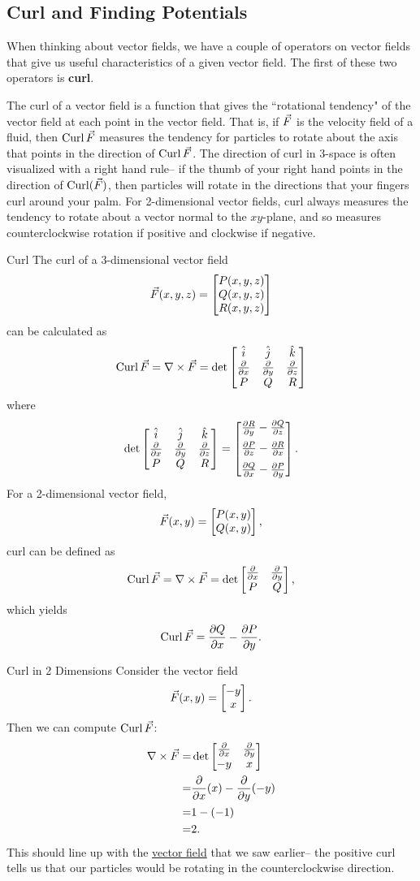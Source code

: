 \subsection{Curl and Finding Potentials}
When thinking about vector fields, we have a couple of operators on vector fields that give us useful characteristics of a given vector field. The first of these two operators is \textbf{curl}.

The curl of a vector field is a function that gives the ``rotational tendency" of the vector field at each point in the vector field. That is, if $\vec{F}$ is the velocity field of a fluid, then $\operatorname{Curl}\vec{F}$ measures the tendency for particles to rotate about the axis that points in the direction of $\operatorname{Curl}\vec{F}$. The direction of curl in 3-space is often visualized with a right hand rule-- if the thumb of your right hand points in the direction of $\operatorname{Curl}(\vec{F})$, then particles will rotate in the directions that your fingers curl around your palm. For 2-dimensional vector fields, curl always measures the tendency to rotate about a vector normal to the $xy$-plane, and so measures counterclockwise rotation if positive and clockwise if negative.

\begin{definition}{Curl}
The curl of a $3$-dimensional vector field $$\vec{F}(x,y,z)=\begin{bmatrix}P(x,y,z)\\Q(x,y,z)\\R(x,y,z)\end{bmatrix}$$ can be calculated as $$\operatorname{Curl} \vec{F}=\nabla\times\vec{F} =\det\begin{bmatrix}\hat{i} & \hat{j} & \hat{k} \\ \frac{\partial }{\partial x} & \frac{\partial }{\partial y} & \frac{\partial}{\partial z}\\ P&Q&R\end{bmatrix}$$ where $$\det\begin{bmatrix}\hat{i} & \hat{j} & \hat{k} \\ \frac{\partial }{\partial x} & \frac{\partial }{\partial y} & \frac{\partial}{\partial z}\\ P&Q&R\end{bmatrix}=\begin{bmatrix}\frac{\partial R}{\partial y} - \frac{\partial Q}{\partial z}\\[6pt] \frac{\partial P}{\partial z}-\frac{\partial R}{\partial x}\\[6pt] \frac{\partial Q}{\partial x}-\frac{\partial P}{\partial y}\end{bmatrix}. $$
For a 2-dimensional vector field, $$\vec{F}(x,y)=\begin{bmatrix}P(x,y)\\Q(x,y)\end{bmatrix}, $$ curl can be defined as $$\operatorname{Curl} \vec{F}=\nabla\times\vec{F}=\det\begin{bmatrix}\frac{\partial }{\partial x} & \frac{\partial }{\partial y}\\ P& Q\end{bmatrix}, $$ which yields $$\operatorname{Curl} \vec{F}=\frac{\partial Q}{\partial x}-\frac{\partial P}{\partial y}.$$
\end{definition}

\begin{example}{Curl in 2 Dimensions}
Consider the vector field $$\vec{F}(x,y)=\begin{bmatrix}-y\\x\end{bmatrix}. $$
Then we can compute $\operatorname{Curl}\vec{F}$:
\begin{align*}
\nabla\times\vec{F}=&\det\begin{bmatrix}\frac{\partial }{\partial x}&\frac{\partial }{\partial y}\\ -y& x\end{bmatrix}\\
=&\frac{\partial }{\partial x}(x)-\frac{\partial }{\partial y}(-y)\\
=&1-(-1)\\
=&2.
\end{align*}
This should line up with the \hyperlink{curl2}{vector field} that we saw earlier-- the positive curl tells us that our particles would be rotating in the counterclockwise direction.
\end{example}

